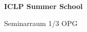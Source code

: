 \documentclass[a4paper]{article}
\begin{document}
\printGenericVSLHeader
\begin{center}
\begin{vsltext}{2.5cm}{4cm}

   \vspace{0.5cm} 

    \textbf{ICLP Summer School} 

    \vspace{1.5cm}

    Seminarraum 1/3 OPG 

\end{vsltext}

\end{center}
\end{document}
